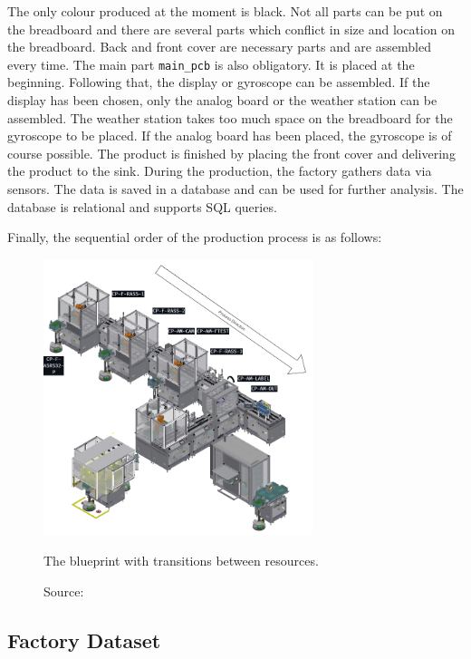 The only colour produced at the moment is black. Not all parts can be put on the breadboard and there are several parts which conflict in size and location on the breadboard. Back and front cover are necessary parts and are assembled every time. The main part \texttt{main\_pcb} is also obligatory. It is placed at the beginning. Following that, the display or gyroscope can be assembled. If the display has been chosen, only the analog board or the weather station can be assembled. The weather station takes too much space on the breadboard for the gyroscope to be placed. If the analog board has been placed, the gyroscope is of course possible. The product is finished by placing the front cover and delivering the product to the sink. During the production, the factory gathers data via sensors. The data is saved in a database and can be used for further analysis. The database is relational and supports SQL queries.

Finally, the sequential order of the production process is as follows:

\begin{figure}[H]
    \centering
    \includegraphics[width=0.7\textwidth]{figures/processdirection.png}
    \caption[Production Process]{The blueprint with transitions between resources.}
    \label{fig:transitions}
    \caption*{Source: \autocite{IoTFactory2024}}
\end{figure}

\subsection*{Factory Dataset}

